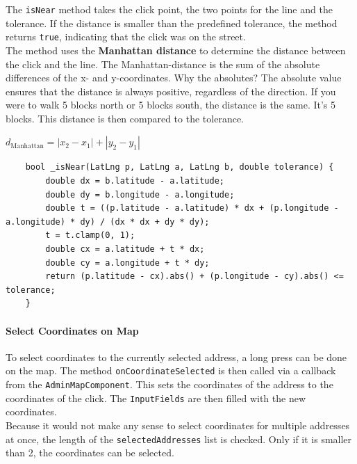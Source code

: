\newpage

The \texttt{isNear} method takes the click point, the two points for the line and the tolerance. If the distance is smaller than the predefined tolerance, the method returns \texttt{true}, indicating that the click was on the street.\\

The method uses the \textbf{Manhattan distance} to determine the distance between the click and the line. The Manhattan-distance is the sum of the absolute differences of the x- and y-coordinates. Why the absolutes? The absolute value ensures that the distance is always positive, regardless of the direction. If you were to walk 5 blocks north or 5 blocks south, the distance is the same. It's 5 blocks\autocite{AlgoDaily2025Mar}. This distance is then compared to the tolerance.\\

\begin{center}
    {\huge $d_{\text{Manhattan}} = |x_2 - x_1| + |y_2 - y_1|$}
\end{center}

\lstset{style=mycsharp, caption=isNear method}
\begin{lstlisting}
    bool _isNear(LatLng p, LatLng a, LatLng b, double tolerance) {
        double dx = b.latitude - a.latitude;
        double dy = b.longitude - a.longitude;
        double t = ((p.latitude - a.latitude) * dx + (p.longitude - a.longitude) * dy) / (dx * dx + dy * dy); 
        t = t.clamp(0, 1);
        double cx = a.latitude + t * dx;
        double cy = a.longitude + t * dy;
        return (p.latitude - cx).abs() + (p.longitude - cy).abs() <= tolerance;
    }
\end{lstlisting}



\paragraph{Select Coordinates on Map}
\label{fig:Select Coordinates on Map}

To select coordinates to the currently selected address, a long press can be done on the map. The method \texttt{onCoordinateSelected} is then called via a callback from the \texttt{AdminMapComponent}. This sets the coordinates of the address to the coordinates of the click. The \texttt{InputFields} are then filled with the new coordinates.\\ 

Because it would not make any sense to select coordinates for multiple addresses at once, the length of the \texttt{selectedAddresses} list is checked. Only if it is smaller than 2, the coordinates can be selected.


